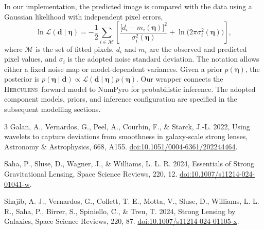 \documentclass[11pt,a4paper]{article}
\newcommand{\herculens}{\textsc{Herculens}}
\begin{document}
In our implementation, the predicted image is compared with the data using a Gaussian likelihood with independent pixel errors,
\begin{equation}
    \ln\mathcal{L}(\boldsymbol{d}\mid\boldsymbol{\eta})
    =-\frac{1}{2}\sum_{i\in\mathcal{M}}\left[
        \frac{\bigl[d_i-m_i(\boldsymbol{\eta})\bigr]^2}
             {\sigma_i^2(\boldsymbol{\eta})}
        +\ln\!\bigl(2\pi\sigma_i^2(\boldsymbol{\eta})\bigr)
    \right],
    \label{eq:likelihood}
\end{equation}
where $\mathcal{M}$ is the set of fitted pixels, $d_i$ and $m_i$ are the observed and predicted pixel values, and $\sigma_i$ is the adopted noise standard deviation. The notation allows either a fixed noise map or model-dependent variances. Given a prior $p(\boldsymbol{\eta})$, the posterior is $p(\boldsymbol{\eta}\mid\boldsymbol{d})\propto\mathcal{L}(\boldsymbol{d}\mid\boldsymbol{\eta})p(\boldsymbol{\eta})$. Our wrapper connects the \herculens\ forward model to NumPyro for probabilistic inference. The adopted component models, priors, and inference configuration are specified in the subsequent modelling sections.

\begin{thebibliography}{3}
Galan, A., Vernardos, G., Peel, A., Courbin, F., \& Starck, J.-L. 2022,
Using wavelets to capture deviations from smoothness in galaxy-scale strong lenses,
Astronomy \& Astrophysics, 668, A155.
\href{https://doi.org/10.1051/0004-6361/202244464}{doi:10.1051/0004-6361/202244464}.

Saha, P., Sluse, D., Wagner, J., \& Williams, L. L. R. 2024,
Essentials of Strong Gravitational Lensing,
Space Science Reviews, 220, 12.
\href{https://doi.org/10.1007/s11214-024-01041-w}{doi:10.1007/s11214-024-01041-w}.

Shajib, A. J., Vernardos, G., Collett, T. E., Motta, V., Sluse, D.,
Williams, L. L. R., Saha, P., Birrer, S., Spiniello, C., \& Treu, T. 2024,
Strong Lensing by Galaxies,
Space Science Reviews, 220, 87.
\href{https://doi.org/10.1007/s11214-024-01105-x}{doi:10.1007/s11214-024-01105-x}.
\end{thebibliography}
\end{document}
